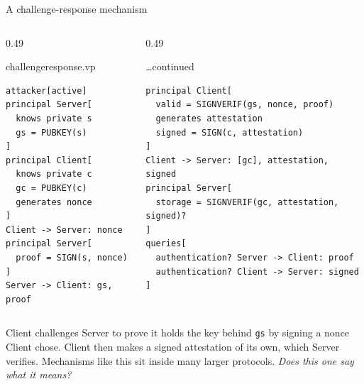 \ifdefined\PRESENTATION\else\PassOptionsToClass{handout}{beamer}\fi\documentclass[aspectratio=169, lualatex]{beamer}
\newcommand{\vpcode}{\fontsize{6}{6.4}\selectfont\ttfamily\color{vpink}}
\begin{document}
\begin{frame}[fragile]{A challenge-response mechanism}
	\begin{columns}[t]
		\begin{column}{0.49\textwidth}
			\begin{vpmodel}{challengeresponse.vp}
				\begin{lstlisting}[basicstyle=\vpcode]
attacker[active]
principal Server[
  knows private s
  gs = PUBKEY(s)
]
principal Client[
  knows private c
  gc = PUBKEY(c)
  generates nonce
]
Client -> Server: nonce
principal Server[
  proof = SIGN(s, nonce)
]
Server -> Client: gs, proof
\end{lstlisting}
			\end{vpmodel}
		\end{column}
		\begin{column}{0.49\textwidth}
			\begin{vpmodel}{\ldots continued}
				\begin{lstlisting}[basicstyle=\vpcode]
principal Client[
  valid = SIGNVERIF(gs, nonce, proof)
  generates attestation
  signed = SIGN(c, attestation)
]
Client -> Server: [gc], attestation, signed
principal Server[
  storage = SIGNVERIF(gc, attestation, signed)?
]
queries[
  authentication? Server -> Client: proof
  authentication? Client -> Server: signed
]
\end{lstlisting}
			\end{vpmodel}
		\end{column}
	\end{columns}
	\vspace{0.4em}
	\begin{center}
		\small
		Client challenges Server to prove it holds the key behind \texttt{gs} by signing a nonce Client chose. Client then makes a signed attestation of its own, which Server verifies. Mechanisms like this sit inside many larger protocols. \textit{Does this one say what it means?}
	\end{center}
\end{frame}
\end{document}
